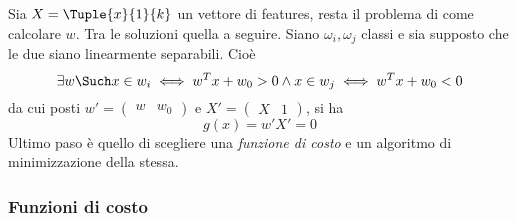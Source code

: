 \documentclass{subfiles}
\begin{document}
Sia \(X = \Tuple{x}{1}{k}\) un vettore di features, resta il problema di come calcolare \(w\).
Tra le soluzioni quella a seguire. Siano \(\omega_{i}, \omega_{j}\) classi e sia supposto che le due siano linearmente separabili. Cioè
\[
    \exists w \Such x \in w_{i} \iff w^{T}x + w_{0} > 0 \land x \in w_{j} \iff w^{T}x + w_{0} < 0
\]
da cui posti \(w' = \begin{pmatrix} w & w_{0} \end{pmatrix}\) e \(X' = \begin{pmatrix} X & 1 \end{pmatrix}\), si ha
\[
    g(x) = w'X' = 0
\]
Ultimo paso è quello di scegliere una \emph{funzione di costo} e un algoritmo di minimizzazione della stessa.

\subsubsection{Funzioni di costo}

\end{document}
